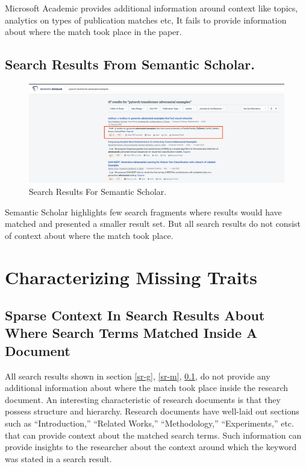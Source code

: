 Microsoft Academic provides additional information around context like topics, analytics on types of publication matches etc,
It fails to provide information about where the match took place in the paper.

\pagebreak
\subsection{Search Results From Semantic Scholar. }
\label{sr-s}
\begin{figure}[h]
    \centering
    \includegraphics[width=\maxwidth{\textwidth}]{src/images/ss-example.png}
    \caption{Search Results For Semantic Scholar. }
    \label{figure\arabic{figurecounter}}
\end{figure}
Semantic Scholar highlights few search fragments where results would have matched and presented a smaller result set. 
But all search results do not consist of context about where the match took place. 

\pagebreak
\section{Characterizing Missing Traits}
\label{section:intro:missing_traits}

\subsection{Sparse Context In Search Results About Where Search Terms Matched Inside A Document}

All search results shown in section \ref{sr-g}, \ref{sr-m}, \ref{sr-s}, do not provide any additional information about where the match took place inside the research document. An interesting characteristic of research documents is that they possess structure and hierarchy. Research documents have well-laid out sections such as “Introduction,” “Related Works,” “Methodology,” “Experiments,” etc. that can provide context about the matched search terms. Such information can provide insights to the researcher about the context around which the keyword was stated in a search result. 

